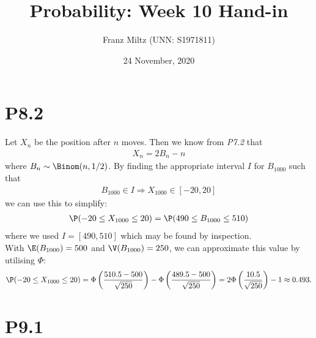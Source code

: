 \documentclass{article}
\begin{document}
\title{Probability: Week 10 Hand-in}
\author{Franz Miltz (UNN: S1971811)}
\date{24 November, 2020}
\maketitle

\section*{P8.2}

Let $X_n$ be the position after $n$ moves. Then we know from \emph{P7.2}
that
\begin{align*}
  X_n = 2B_n-n
\end{align*}
where $B_n\sim\Binom(n,1/2)$. By finding the appropriate interval $I$
for $B_{1000}$ such that
\begin{align*}
    B_{1000}\in I\Rightarrow X_{1000}\in [-20, 20]
\end{align*}
we can use this to simplify:
\begin{align*}
  \P(-20\leq X_{1000} \leq 20) = \P(490 \leq B_{1000} \leq 510)
\end{align*}
where we used $I=[490, 510]$ which may be found by inspection.\\
With $\E(B_{1000})=500$ and $\V(B_{1000})=250$, we can approximate this value
by utilising $\Phi$:
\begin{align*}
  \P(-20\leq X_{1000} \leq 20) = \Phi\left(\frac{510.5-500}{\sqrt{250}}\right)
  - \Phi\left(\frac{489.5-500}{\sqrt{250}}\right)
  = 2\Phi\left(\frac{10.5}{\sqrt{250}}\right)-1\approx 0.493.
\end{align*}

\section*{P9.1}
\end{document}
